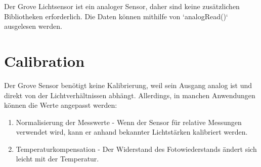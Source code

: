 Der Grove Lichtsensor ist ein analoger Sensor, daher sind keine zusätzlichen Bibliotheken erforderlich. Die Daten können mithilfe von `analogRead()` ausgelesen werden.









\section{Calibration}

Der Grove Sensor benötigt keine Kalibrierung, weil sein Ausgang analog ist und direkt von der Lichtverhältnissen abhängt. Allerdings, in manchen Anwendungen können die Werte angepasst werden:
\begin{enumerate}
	\item Normalisierung der Messwerte - Wenn der Sensor für relative Messungen verwendet wird, kann er anhand bekannter Lichtstärken kalibriert werden.
	\item Temperaturkompensation - Der Widerstand des Fotowiederstands ändert sich leicht mit der Temperatur.
\end{enumerate}


